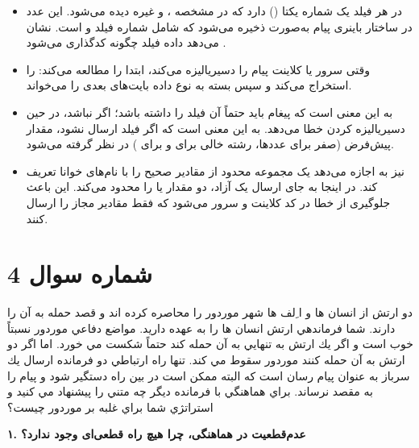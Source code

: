 \begin{itemize}
    \item در  هر فیلد یک شماره یکتا () دارد که در مشخصه ،  و غیره دیده می‌شود. این عدد در ساختار باینری پیام به‌صورت  ذخیره می‌شود که شامل شماره فیلد و  است.  نشان می‌دهد داده فیلد چگونه کدگذاری می‌شود .  
    \item وقتی سرور یا کلاینت پیام را دسیریالیزه می‌کند، ابتدا  را مطالعه می‌کند:  را استخراج می‌کند و سپس بسته به نوع داده بایت‌های بعدی را می‌خواند.  
    \item {} به این معنی است که پیغام باید حتماً آن فیلد را داشته باشد؛ اگر نباشد، در حین دسیریالیزه کردن خطا می‌دهد.  به این معنی است که اگر فیلد ارسال نشود، مقدار پیش‌فرض (صفر برای عددها، رشته خالی برای  و  برای ) در نظر گرفته می‌شود.  
    \item {} نیز به  اجازه می‌دهد یک مجموعه محدود از مقادیر صحیح را با نام‌های خوانا تعریف کند. در اینجا  به جای ارسال یک  آزاد، دو مقدار  یا  را محدود می‌کند. این باعث جلوگیری از خطا در کد کلاینت و سرور می‌شود که فقط مقادیر مجاز را ارسال کنند.  
\end{itemize}

\section*{شماره سوال 4}

دو ارتش از انسان ها و ا ِلف ها شهر موردور را محاصره كرده اند و قصد حمله به آن را دارند. شما فرماندهي ارتش انسان ها
را به عهده داريد. مواضع دفاعي موردور نسبتاً خوب است و اگر يك ارتش به تنهايي به آن حمله كند حتماً شكست مي خورد. اما
اگر دو ارتش به آن حمله كنند موردور سقوط مي كند. تنها راه ارتباطي دو فرمانده ارسال يك سرباز به عنوان پيام رسان است كه
البته ممكن است در بين راه دستگير شود و پيام را به مقصد نرساند. براي هماهنگي با فرمانده ديگر چه متني را پيشنهاد مي كنيد
و استراتژي شما براي غلبه بر موردور چيست؟ 

\noindent
\textbf{۱. عدم‌قطعیت در هماهنگی، چرا هیچ راه قطعی‌ای وجود ندارد؟}

